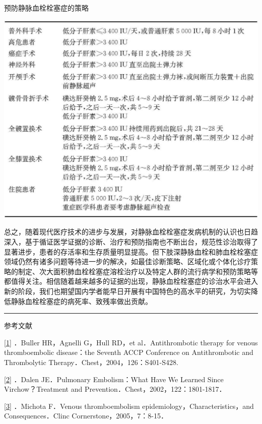 \begin{table}[htbp]
\centering
\caption{预防静脉血栓栓塞症的策略}
\label{tab16-14}
\includegraphics{./images/Image00135.jpg}
\end{table}

总之，随着现代医疗技术的进步与发展，对静脉血栓栓塞症发病机制的认识也日趋深入，基于循证医学证据的诊断、治疗和预防指南也不断出台，规范性诊治取得了显著进步，患者的存活率和生存质量明显提高。但下肢深静脉血栓和肺血栓栓塞症领域仍然有诸多问题等待进一步的解决，如最佳诊断策略、区域化或个体化诊疗策略的制定、次大面积肺血栓栓塞症溶栓治疗以及特定人群的流行病学和预防策略等都值得关注。相信随着越来越多的证据的出现，静脉血栓栓塞症的诊治水平会进入新的阶段，我们也期望国内学者能早日开展有中国特色的高水平的研究，为切实降低静脉血栓栓塞症的病死率、致残率做出贡献。

\begin{center}\rule{0.5\linewidth}{\linethickness}\end{center}

参考文献

\protect\hyperlink{text00022.htmlux5cux23ch1-21-back}{{[}1{]}} ．Buller
HR，Agnelli G，Hull RD，et al．Antithrombotic therapy for venous
thromboembolic disease：the Seventh ACCP Conference on Antithrombotic
and Thrombolytic Therapy．Chest，2004，126：S401-S428.

\protect\hyperlink{text00022.htmlux5cux23ch2-21-back}{{[}2{]}} ．Dalen
JE．Pulmonary Embolism：What Have We Learned Since Virchow？Treatment
and Prevention．Chest，2002，122：1801-1817．

\protect\hyperlink{text00022.htmlux5cux23ch3-21-back}{{[}3{]}} ．Michota
F．Venous thromboembolism epidemiology，Characteristics，and
Consequences．Clinc Cornerstone，2005，7：8-15．

